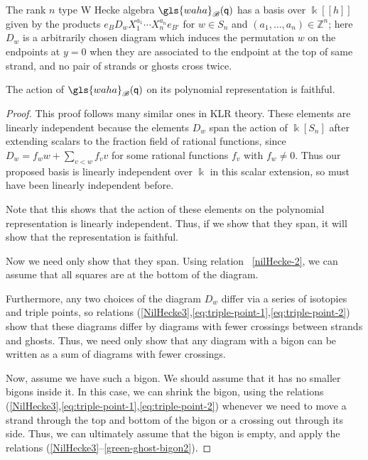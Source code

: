 \documentclass[ALCO,ThmDefs,Unicode,epreuves]{cedram}
\newcommand{\pq}{\mathsf{q}}
\newcommand{\K}{\Bbbk}%
\newcommand{\Z}{\mathbb{Z}}
\newcommand{\waha}{\gls{waha}}
\newcommand\llbracket{[\![}
\newcommand\rrbracket{]\!]}
\begin{document}
\begin{prop}\label{prop:waha-basis}
 The rank $n$ type W Hecke algebra $\waha_{\mathscr{B}}(\pq)$ has a basis over $\K\llbracket h\rrbracket $ given by the products
 $e_{B}D_wX_1^{a_1}\cdots X_n^{a_n}e_{B'}$ for $w\in S_n$ and $(a_1,\dots,
 a_n)\in \Z^n$; here $D_w$ is a arbitrarily chosen diagram which
 induces the permutation $w$ on the endpoints at $y=0$ when they are
 associated to the endpoint at the top of same strand, and no pair of
 strands or ghosts cross twice.

 The action of $\waha_{\mathscr{B}}(\pq)$ on its polynomial
 representation is faithful.
\end{prop}
\begin{proof}
 This proof follows many similar ones in KLR theory. These elements
 are linearly independent because the elements $D_w$ span the action
 of $\K[S_n]$ after extending scalars to the fraction field of
 rational functions, since $D_w=f_w w+\sum_{v<w} f_v v$ for some
 rational functions $f_v$ with $f_w\neq 0$. Thus our proposed basis
 is linearly independent over $\K$ in this scalar extension, so must
 have been linearly independent before.

 Note that this shows that the action of these elements on the
 polynomial representation is linearly independent. Thus, if we show
 that they span, it will show that the representation is faithful. 

 Now we need only show that they span. Using relation
~\eqref{nilHecke-2}, we can assume that all squares are at the bottom
 of the diagram. 

Furthermore, any two choices of the diagram $D_w$ differ via a series
of isotopies and triple points, so relations
(\ref{NilHecke3},\ref{eq:triple-point-1},\ref{eq:triple-point-2}) show
that these diagrams differ by diagrams with fewer crossings between
strands and ghosts. Thus, we
need only show that any diagram with a bigon can be written as a sum
of diagrams with fewer crossings. 

Now, assume we have such a bigon. We should assume that it has no
smaller bigons inside it. In this case, we can shrink the bigon,
using the relations
(\ref{NilHecke3},\ref{eq:triple-point-1},\ref{eq:triple-point-2})
whenever we need to move a strand through the top and bottom of the
bigon or a crossing out through its side. Thus, we can ultimately
assume that the bigon is empty, and apply the relations (\ref{NilHecke3}--\ref{green-ghost-bigon2}).
\end{proof}
\end{document}
